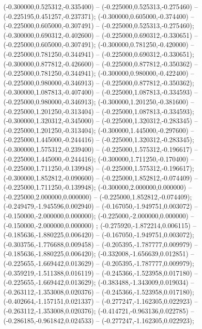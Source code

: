  (-0.300000,0.525312,-0.335400) -- (-0.225000,0.525313,-0.275460) -- (-0.225195,0.451257,-0.237371);
 (-0.300000,0.605000,-0.374400) -- (-0.225000,0.605000,-0.307491) -- (-0.225000,0.525313,-0.275460);
 (-0.300000,0.690312,-0.402600) -- (-0.225000,0.690312,-0.330651) -- (-0.225000,0.605000,-0.307491);
 (-0.300000,0.781250,-0.420000) -- (-0.225000,0.781250,-0.344941) -- (-0.225000,0.690312,-0.330651);
 (-0.300000,0.877812,-0.426600) -- (-0.225000,0.877812,-0.350362) -- (-0.225000,0.781250,-0.344941);
 (-0.300000,0.980000,-0.422400) -- (-0.225000,0.980000,-0.346913) -- (-0.225000,0.877812,-0.350362);
 (-0.300000,1.087813,-0.407400) -- (-0.225000,1.087813,-0.334593) -- (-0.225000,0.980000,-0.346913);
 (-0.300000,1.201250,-0.381600) -- (-0.225000,1.201250,-0.313404) -- (-0.225000,1.087813,-0.334593);
 (-0.300000,1.320312,-0.345000) -- (-0.225000,1.320312,-0.283345) -- (-0.225000,1.201250,-0.313404);
 (-0.300000,1.445000,-0.297600) -- (-0.225000,1.445000,-0.244416) -- (-0.225000,1.320312,-0.283345);
 (-0.300000,1.575312,-0.239400) -- (-0.225000,1.575312,-0.196617) -- (-0.225000,1.445000,-0.244416);
 (-0.300000,1.711250,-0.170400) -- (-0.225000,1.711250,-0.139948) -- (-0.225000,1.575312,-0.196617);
 (-0.300000,1.852812,-0.090600) -- (-0.225000,1.852812,-0.074409) -- (-0.225000,1.711250,-0.139948);
 (-0.300000,2.000000,0.000000) -- (-0.225000,2.000000,0.000000) -- (-0.225000,1.852812,-0.074409);
 (-0.249479,-1.945596,0.002940) -- (-0.167050,-1.949751,0.003072) -- (-0.150000,-2.000000,0.000000);
 (-0.225000,-2.000000,0.000000) -- (-0.150000,-2.000000,0.000000) ;
 (-0.275920,-1.872214,0.006115) -- (-0.185636,-1.880225,0.006420) -- (-0.167050,-1.949751,0.003072);
 (-0.303756,-1.776688,0.009458) -- (-0.205395,-1.787777,0.009979) -- (-0.185636,-1.880225,0.006420);
 (-0.332008,-1.656639,0.012851) -- (-0.225655,-1.669442,0.013629) -- (-0.205395,-1.787777,0.009979);
 (-0.359219,-1.511388,0.016119) -- (-0.245366,-1.523958,0.017180) -- (-0.225655,-1.669442,0.013629);
 (-0.383488,-1.343009,0.019034) -- (-0.263112,-1.353008,0.020376) -- (-0.245366,-1.523958,0.017180);
 (-0.402664,-1.157151,0.021337) -- (-0.277247,-1.162305,0.022923) -- (-0.263112,-1.353008,0.020376);
 (-0.414721,-0.963136,0.022785) -- (-0.286185,-0.961842,0.024533) -- (-0.277247,-1.162305,0.022923);

